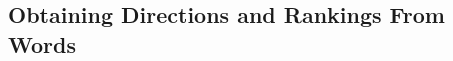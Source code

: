 


\subsection{Obtaining Directions and Rankings From Words}\label{ch3:LearningInterpretableDirections}



